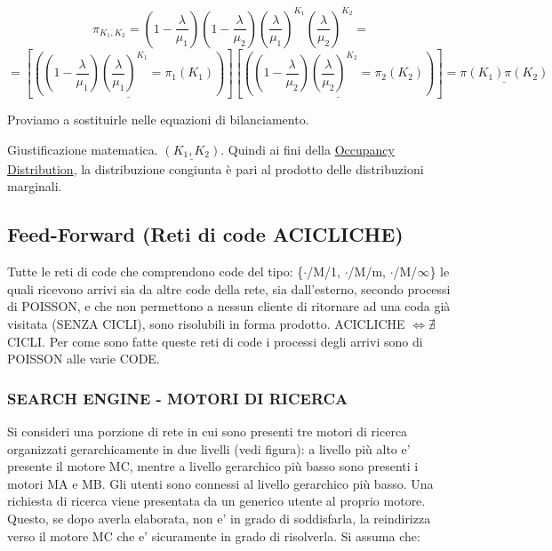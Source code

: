 \[
	\pi_{K_1,K_2} = (1-\frac{\lambda}{\mu_1})(1-\frac{\lambda}{\mu_2})(\frac{\lambda}{\mu_1})^{K_1}(\frac{\lambda}{\mu_2})^{K_2} =
\]
\[	
	= [\underline{((1-\frac{\lambda}{\mu_1})(\frac{\lambda}{\mu_1})^{K_1} = \pi_1(K_1))}][\underline{((1-\frac{\lambda}{\mu_2})(\frac{\lambda}{\mu_2})^{K_2} = \pi_2(K_2))}] = \underline{\pi(K_1)\pi(K_2)}
\]

Proviamo a sostituirle nelle equazioni di bilanciamento.

Giustificazione matematica. $\underline{(K_1,K_2)}$. Quindi ai fini della \underline{Occupancy Distribution}, la distribuzione congiunta è pari al prodotto delle distribuzioni marginali.

\subsection{Feed-Forward (Reti di code ACICLICHE)}

Tutte le reti di code che comprendono code del tipo: \{$\mathord{\cdot}$/M/1, $\mathord{\cdot}$/M/m, $\mathord{\cdot}$/M/$\infty$\} le quali ricevono arrivi sia da altre code della rete, sia dall'esterno, secondo processi di POISSON, e che non permettono a nessun cliente di ritornare ad una coda già visitata (SENZA CICLI), sono risolubili in forma prodotto. ACICLICHE $\iff \nexists$ CICLI. Per come sono fatte queste reti di code i processi degli arrivi sono di POISSON alle varie CODE.

\subsubsection{SEARCH ENGINE - MOTORI DI RICERCA}

Si consideri una porzione di rete in cui sono presenti tre motori di ricerca organizzati gerarchicamente in due livelli (vedi figura): a livello più alto e’ presente il motore MC, mentre a livello gerarchico più basso sono presenti i motori MA e MB. Gli utenti sono connessi al livello gerarchico più basso. Una richiesta di ricerca viene presentata da un generico utente al proprio motore. Questo, se dopo averla elaborata, non e’ in grado di soddisfarla, la reindirizza verso il motore MC che e’ sicuramente in grado di risolverla. Si assuma che:

